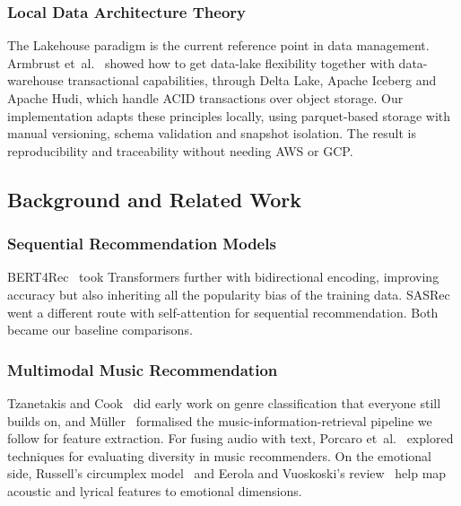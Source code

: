 \documentclass[]{ceurart}
\begin{document}
\subsubsection{Local Data Architecture Theory}
The Lakehouse paradigm is the current reference point in data management.
Armbrust et~al.~\cite{armbrust2020delta} showed how to get data-lake
flexibility together with data-warehouse transactional capabilities, through
Delta Lake, Apache Iceberg and Apache Hudi, which handle ACID transactions over
object storage. Our implementation adapts these principles locally, using
parquet-based storage with manual versioning, schema validation and snapshot
isolation. The result is reproducibility and traceability without needing AWS
or GCP.

\subsection{Background and Related Work}
\label{sec:background}

\subsubsection{Sequential Recommendation Models}
BERT4Rec~\cite{sun2019bert4rec} took Transformers further with bidirectional
encoding, improving accuracy but also inheriting all the popularity bias of the
training data. SASRec~\cite{kang2018self} went a different route with
self-attention for sequential recommendation. Both became our baseline
comparisons.

\subsubsection{Multimodal Music Recommendation}
Tzanetakis and Cook~\cite{tzanetakis2002genre} did early work on genre
classification that everyone still builds on, and
M{\"u}ller~\cite{mueller2015fundamentals} formalised the
music-information-retrieval pipeline
we follow for feature extraction. For fusing audio with text, Porcaro
et~al.~\cite{porcaro2021diversity} explored techniques for evaluating diversity
in music recommenders. On the emotional side, Russell's circumplex
model~\cite{russell1980circumplex} and Eerola and Vuoskoski's
review~\cite{eerola2013review} help map acoustic and lyrical features to
emotional dimensions.
\end{document}
